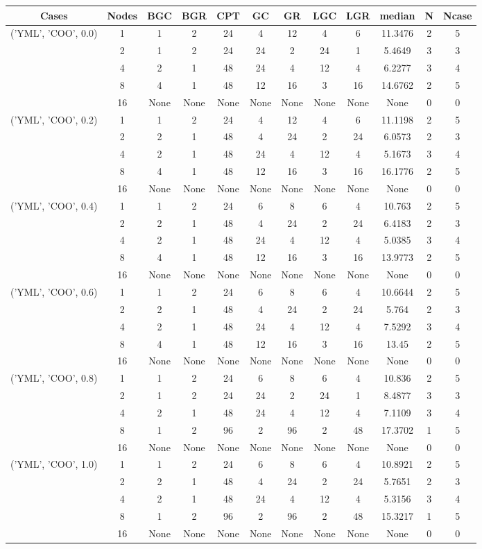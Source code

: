 \begin{tabular}{cccccccccccc}
\hline
Cases & Nodes& BGC& BGR& CPT& GC& GR& LGC& LGR& median & N & Ncase \\
\hline
\multirow{5}{*}{('YML', 'COO', 0.0)}& 1& 1& 2& 24& 4& 12& 4& 6& 11.3476& 2& 5\\
& 2& 1& 2& 24& 24& 2& 24& 1& 5.4649& 3& 3\\
& 4& 2& 1& 48& 24& 4& 12& 4& 6.2277& 3& 4\\
& 8& 4& 1& 48& 12& 16& 3& 16& 14.6762& 2& 5\\
& 16& None& None& None& None& None& None& None& None& 0& 0\\
\hline
\multirow{5}{*}{('YML', 'COO', 0.2)}& 1& 1& 2& 24& 4& 12& 4& 6& 11.1198& 2& 5\\
& 2& 2& 1& 48& 4& 24& 2& 24& 6.0573& 2& 3\\
& 4& 2& 1& 48& 24& 4& 12& 4& 5.1673& 3& 4\\
& 8& 4& 1& 48& 12& 16& 3& 16& 16.1776& 2& 5\\
& 16& None& None& None& None& None& None& None& None& 0& 0\\
\hline
\multirow{5}{*}{('YML', 'COO', 0.4)}& 1& 1& 2& 24& 6& 8& 6& 4& 10.763& 2& 5\\
& 2& 2& 1& 48& 4& 24& 2& 24& 6.4183& 2& 3\\
& 4& 2& 1& 48& 24& 4& 12& 4& 5.0385& 3& 4\\
& 8& 4& 1& 48& 12& 16& 3& 16& 13.9773& 2& 5\\
& 16& None& None& None& None& None& None& None& None& 0& 0\\
\hline
\multirow{5}{*}{('YML', 'COO', 0.6)}& 1& 1& 2& 24& 6& 8& 6& 4& 10.6644& 2& 5\\
& 2& 2& 1& 48& 4& 24& 2& 24& 5.764& 2& 3\\
& 4& 2& 1& 48& 24& 4& 12& 4& 7.5292& 3& 4\\
& 8& 4& 1& 48& 12& 16& 3& 16& 13.45& 2& 5\\
& 16& None& None& None& None& None& None& None& None& 0& 0\\
\hline
\multirow{5}{*}{('YML', 'COO', 0.8)}& 1& 1& 2& 24& 6& 8& 6& 4& 10.836& 2& 5\\
& 2& 1& 2& 24& 24& 2& 24& 1& 8.4877& 3& 3\\
& 4& 2& 1& 48& 24& 4& 12& 4& 7.1109& 3& 4\\
& 8& 1& 2& 96& 2& 96& 2& 48& 17.3702& 1& 5\\
& 16& None& None& None& None& None& None& None& None& 0& 0\\
\hline
\multirow{5}{*}{('YML', 'COO', 1.0)}& 1& 1& 2& 24& 6& 8& 6& 4& 10.8921& 2& 5\\
& 2& 2& 1& 48& 4& 24& 2& 24& 5.7651& 2& 3\\
& 4& 2& 1& 48& 24& 4& 12& 4& 5.3156& 3& 4\\
& 8& 1& 2& 96& 2& 96& 2& 48& 15.3217& 1& 5\\
& 16& None& None& None& None& None& None& None& None& 0& 0\\
\hline
\end{tabular}


